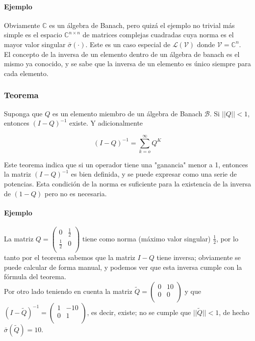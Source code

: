 \paragraph{Ejemplo} Obviamente $\mathbb{C}$ es un álgebra de Banach, pero quizá el ejemplo no trivial más simple es el espacio $\mathbb{C}^{n \times n}$ de matrices complejas cuadradas cuya norma es el mayor valor singular $\bar{\sigma}(\cdot)$. Este es un caso especial de $\mathcal{L} ( \mathcal{V} )$ donde $\mathcal{V} = \mathbb{C}^n$. \\

El concepto de la inversa de un elemento dentro de un álgebra de banach es el mismo ya conocido, y se sabe que la inversa de un elemento es único siempre para cada elemento.

\subsubsection{Teorema} 

Suponga que $Q$ es un elemento miembro de un álgebra de Banach $\mathcal{B}$. Si $||Q|| < 1 $, entonces $(I - Q)^{-1}$ existe. Y adicionalmente

\begin{equation*}
    ( I - Q )^{-1} = \sum_{k=o}^{\infty} Q^K
\end{equation*}

Este teorema indica que si un operador tiene una "ganancia" menor a 1, entonces la matriz $ ( I - Q )^{-1}$ es bien definida, y se puede expresar como una serie de potencias. Esta condición de la norma es suficiente para la existencia de la inversa de $(1 - Q)$ pero no es necesaria.

\paragraph{Ejemplo}

La matriz $Q = \left(
\begin{array}{cc}
 0 & \frac{1}{2} \\
 \frac{1}{2} & 0 \\
\end{array}
\right)$ tiene como norma (máximo valor singular) $\frac{1}{2}$, por lo tanto por el teorema sabemos que la matriz $I-Q$ tiene inversa; obviamente se puede calcular de forma manual, y podemos ver que esta inversa cumple con la fórmula del teorema. \\

Por otro lado teniendo en cuenta la matriz $\tilde{Q} = \left(
\begin{array}{cc}
 0 & 10 \\
 0 & 0 \\
\end{array}
\right)$ y que $(I-\tilde{Q})^{-1} = \left(
\begin{array}{cc}
 1 & -10 \\
 0 & 1 \\
\end{array}
\right)$, es decir, existe; no se cumple que $||\tilde{Q}|| < 1$, de hecho $\bar{\sigma}(\tilde{Q}) = 10$. \\

